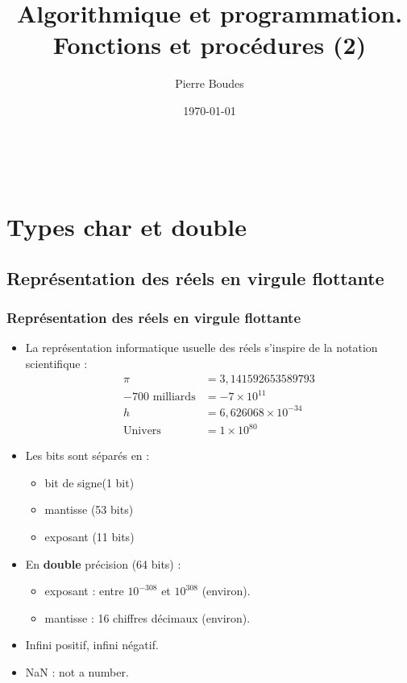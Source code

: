 \documentclass[xcolor=pdftex,svgnames,table]{beamer}
\title{Algorithmique et programmation.\\ Fonctions et procédures (2)}
\author{Pierre Boudes}
\date{\today}
\begin{document}
\begin{frame}
        \titlepage
        \vfill
        \begin{center}
                \\[2.5ex]
                {\tiny\CcNote{\CcLongnameByNcSa}}
                \vspace*{-2.5ex}
        \end{center}
\end{frame}

\section[Plan]{}
\frame[label=plan]{\tableofcontents}
\section{Types char et double}
\subsection{Représentation des réels en virgule flottante}
\begin{frame}
    \frametitle{Représentation des réels en virgule flottante}
    \begin{itemize}
    \item La représentation informatique usuelle des réels s'inspire de la
      notation scientifique :
      \begin{align*}
        \pi &= 3,141592653589793\tag{pi}\\
        -700 \text{ milliards} &= -7 \times 10^{11}\tag{Paulson}\\
        h &= 6,626068 \times 10^{-34} \tag{Planck}\\
        \text{Univers} &= 1 \times 10^{80}  \tag{Atomes}
      \end{align*}\pause
\vspace{-.8cm}
\item Les bits sont séparés en :
  \begin{itemize}
  \item bit de signe\hfill (1 bit)
  \item mantisse \hfill (53 bits)
  \item exposant \hfill (11 bits)
  \end{itemize}\pause
\item En \textbf{double} précision (64 bits) :
  \begin{itemize}
\item exposant : entre $10^{-308}$ et $10^{308}$ (environ).
\item mantisse : 16 chiffres décimaux (environ).
  \end{itemize}\pause
\item Infini positif, infini négatif.
\item NaN : not a number.
    \end{itemize}
\end{frame}
\end{document}
